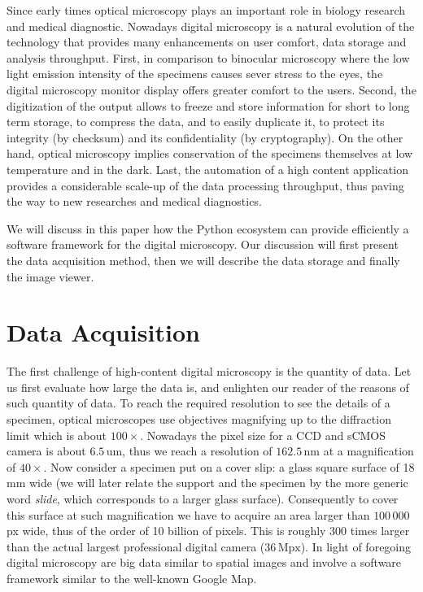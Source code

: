 \documentclass[letterpaper,compsoc,twoside]{IEEEtran}
\begin{document}
Since early times optical microscopy plays an important role in biology
research and medical diagnostic. Nowadays digital microscopy is a natural
evolution of the technology that provides many enhancements on user comfort,
data storage and analysis throughput. First, in comparison to binocular
microscopy where the low light emission intensity of the specimens causes
sever stress to the eyes, the digital microscopy monitor display offers
greater comfort to the users. Second, the digitization of the output allows to
freeze and store information for short to long term storage, to compress the
data, and to easily duplicate it, to protect its integrity (by checksum) and
its confidentiality (by cryptography). On the other hand, optical microscopy
implies conservation of the specimens themselves at low temperature and in the
dark. Last, the automation of a high content application provides a
considerable scale-up of the data processing throughput, thus paving the way
to new researches and medical diagnostics.

We will discuss in this paper how the Python ecosystem can provide efficiently
a software framework for the digital microscopy. Our discussion will first
present the data acquisition method, then we will describe the data storage
and finally the image viewer.

\section{Data Acquisition\label{data-acquisition}}


The first challenge of high-content digital microscopy is the quantity of data. Let us
first evaluate how large the data is, and enlighten our reader of the reasons
of such quantity of data.
To reach the required resolution to
see the details of a specimen, optical microscopes use objectives magnifying up to the
diffraction limit which is about $100\times$. Nowadays the pixel size for a CCD and sCMOS
camera is about $6.5\,\text{um}$, thus we reach a resolution
of $162.5\,\text{nm}$ at a magnification of $40\times$.
Now consider a specimen put on a cover
slip: a glass square surface of 18 mm wide (we will later relate the support and the
specimen by the more generic word \emph{slide}, which corresponds to a larger glass surface). Consequently
to cover this surface at such magnification we have to acquire an area larger than $100\,000$
px wide, thus of the order of 10 billion of pixels. This is roughly 300 times larger than the actual
largest professional digital camera ($36\,\text{Mpx}$). In light of foregoing digital
microscopy are big data similar to spatial images and involve a software framework similar to the
well-known Google Map.
\end{document}
